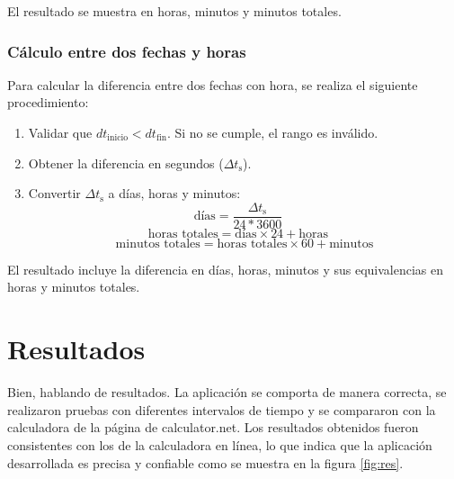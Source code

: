 \documentclass[conference]{IEEEtran}
\begin{document}
        El resultado se muestra en horas, minutos y minutos totales.

    \subsubsection{Cálculo entre dos fechas y horas}
        Para calcular la diferencia entre dos fechas con hora, se realiza el siguiente procedimiento:
        
        \begin{enumerate}
            \item Validar que \( dt_{\text{inicio}} < dt_{\text{fin}} \). Si no se cumple, el rango es inválido.
            \item Obtener la diferencia en segundos (\( \Delta t_{\text{s}} \)).
            \item Convertir \( \Delta t_{\text{s}} \) a días, horas y minutos:
            \[
                \text{días} = \frac{\Delta t_{\text{s}}}{24 * 3600} \quad 
            \]
            \[
                \text{horas totales} = \text{días} \times 24 + \text{horas} \quad 
            \]
            \[
                \text{minutos totales} = \text{horas totales} \times 60 + \text{minutos}
            \]
        \end{enumerate}
        
        El resultado incluye la diferencia en días, horas, minutos y sus equivalencias en horas y minutos totales.
        

\section{Resultados}
    Bien, hablando de resultados. La aplicación se comporta de manera correcta, se realizaron pruebas con diferentes intervalos de tiempo y se compararon con la calculadora de la página de calculator.net\cite{calculator}. Los resultados obtenidos fueron consistentes con los de la calculadora en línea, lo que indica que la aplicación desarrollada es precisa y confiable como se muestra en la figura \ref{fig:res}.
\end{document}
